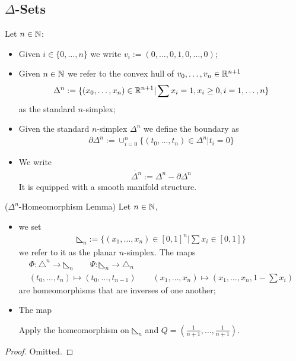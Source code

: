 \documentclass[Total.tex]{subfiles}
\begin{document}
			\subsection{$\Delta$-Sets}
				\begin{Def}
					Let $n\in \mathbb{N}$:
					\begin{itemize}
						\item Given $i\in \{0,\dots,n\}$ we write  $v_i:=(0,\dots,0,1,0,\dots,0)$;
						\item Given $n\in \mathbb{N}$ we refer to the convex hull of $v_0,\dots, v_n\in \mathbb{R}^{n+1}$
						\begin{gather*}
							\Delta^n:=\{(x_0,\dots,x_n)\in \mathbb{R}^{n+1}|\sum x_i=1,x_i\geq 0,i=1,\dots,n\}
						\end{gather*}
						as the standard $n$-simplex;  
						\item Given the standard $n$-simplex $\Delta^n$ we define the boundary as
						\begin{gather*}
							\partial \Delta^n:=\cup_{i=0}^n \{(t_0,\dots,t_n)\in \Delta^n|t_i=0\}
						\end{gather*}
						\item We write
						\begin{gather*}
							\mathring{\Delta^n}:=\Delta^n-\partial \Delta^n
						\end{gather*}
						It is equipped with a smooth manifold structure.
					\end{itemize}
				\end{Def}
				
				\begin{lemma}
					($\Delta^n$-Homeomorphism Lemma) Let $n\in \mathbb{N}$,
					\begin{itemize}
						\item  we set
						\begin{gather*}
							\lltriangle_n:=\{(x_1,\dots,x_n)\in [0,1]^n|\sum x_i\in [0,1]\}
						\end{gather*}
						we refer to it as the planar $n$-simplex. The maps
						\begin{gather*}
							\Phi:\triangle^n\rightarrow \lltriangle_n\qquad \Psi:\lltriangle_n\rightarrow \triangle_n\\
							(t_0,\dots,t_n)\mapsto (t_0,\dots,t_{n-1})\qquad (x_1,\dots,x_n)\mapsto (x_1,\dots,x_n,1-\sum x_i)
						\end{gather*}
						are homeomorphisms that are inverses of one another;
						\item The map
						\begin{center}
						\end{center}
						
						Apply the homeomorphism on $\lltriangle_n$ and $Q=(\frac{1}{n+1},\dots,\frac{1}{n+1})$.
					\end{itemize}
				\end{lemma}
				\begin{proof}
					Omitted.
				\end{proof}
\end{document}
